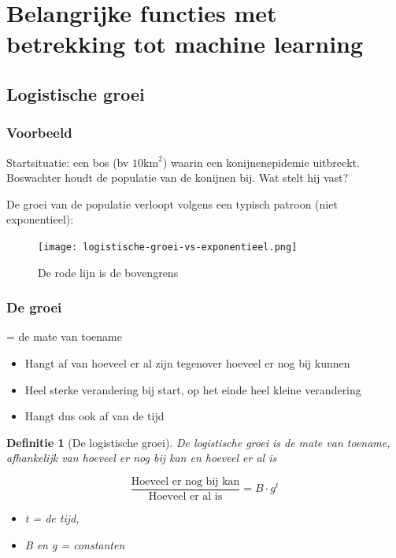 \documentclass{article}
\newtheorem{theorem}{Definitie}[section]
\begin{document}
\section{Belangrijke functies met betrekking tot machine learning}

\subsection{Logistische groei}

\subsubsection{Voorbeeld}

Startsituatie: een bos (bv $\text{10km}^2$) waarin een konijnenepidemie uitbreekt.
Boswachter houdt de populatie van de konijnen bij. Wat stelt hij vast?

De groei van de populatie verloopt volgens een typisch patroon (niet exponentieel):

\begin{figure}[H]
    \centering
    \texttt{[image: logistische-groei-vs-exponentieel.png]}
    \caption{De rode lijn is de bovengrens}
\end{figure}

\subsubsection{De groei}

= de mate van toename

\begin{itemize}
    \item Hangt af van hoeveel er al zijn tegenover hoeveel er nog bij kunnen
    \item Heel sterke verandering bij start, op het einde heel kleine verandering
    \item Hangt dus ook af van de tijd
\end{itemize}

\begin{theorem}[De logistische groei]
De logistische groei is de mate van toename, afhankelijk van hoeveel er nog bij kan en hoeveel er al is

\begin{equation}
    \frac{\text{Hoeveel er nog bij kan}}{\text{Hoeveel er al is}} = B \cdot g^t
\end{equation}

\begin{itemize}
    \item t = de tijd,
    \item B en g = constanten
\end{itemize}


\end{theorem}
\end{document}
